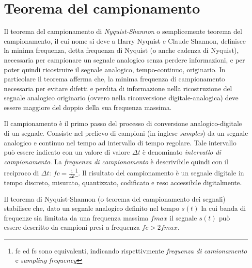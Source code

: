 
\section{Teorema del campionamento}

Il teorema del campionamento di \emph{Nyquist-Shannon} o semplicemente teorema del
campionamento, il cui nome si deve a Harry Nyquist e
Claude Shannon, definisce la minima frequenza, detta
frequenza di Nyquist (o anche cadenza di Nyquist), necessaria per campionare un
segnale analogico senza perdere informazioni, e per poter quindi ricostruire il
segnale analogico, tempo-continuo, originario.
In particolare il teorema afferma che,
la minima frequenza di campionamento necessaria per evitare difetti e perdita di
informazione nella ricostruzione del segnale analogico originario (ovvero nella
riconversione digitale-analogica) deve essere maggiore del doppio della sua
frequenza massima.

Il campionamento è il primo passo del processo di conversione analogico-digitale
di un segnale. Consiste nel prelievo di campioni (in inglese \emph{samples}) da
un segnale analogico e continuo nel tempo ad intervallo di tempo regolare.
Tale intervallo può essere indicato con un valore di valore $\Delta t$ è denominato
\emph{intervallo di campionamento}. La \emph{frequenza di campionamento} è
descrivibile quindi con il reciproco di
$ \Delta t $: $ fc = \frac{1}{\Delta t} $\footnote{fc ed fs sono equivalenti,
indicando rispettivmente \emph{frequenza di camionamento} e s\emph{ampling frequency}}.
Il risultato del campionamento è un segnale digitale in tempo discreto,
misurato, quantizzato, codificato e reso accessibile digitalmente.

Il teorema di Nyquist-Shannon (o teorema del campionamento dei segnali) stabilisce
che, dato un segnale analogico definito nel tempo $s(t)$ la cui banda di frequenze
sia limitata da una frequenza massima $fmax$ il segnale $s(t)$ può essere descritto
da campioni presi a frequenza $fc > 2fmax$.

\clearpage
